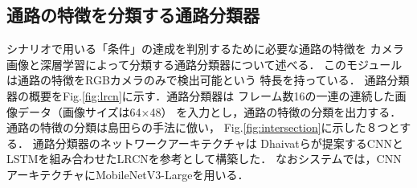 \documentclass{sice-si}
\begin{document}

\subsection{通路の特徴を分類する通路分類器}
シナリオで用いる「条件」の達成を判別するために必要な通路の特徴を
カメラ画像と深層学習によって分類する通路分類器について述べる．
このモジュールは通路の特徴をRGBカメラのみで検出可能という
特長を持っている．
通路分類器の概要をFig.\ref{fig:lrcn}に示す．通路分類器は
フレーム数16の一連の連続した画像データ（画像サイズは64×48）
を入力とし，通路の特徴の分類を出力する．
通路の特徴の分類は島田らの手法\cite{shimada2020}に倣い，
Fig.\ref{fig:intersection}に示した８つとする．
通路分類器のネットワークアーキテクチャは
Dhaivatらが提案するCNNとLSTMを組み合わせたLRCN\cite{lrcn}を参考として構築した．
なおシステムでは，CNNアーキテクチャにMobileNetV3-Large\cite{v3}を用いる．
\end{document}
